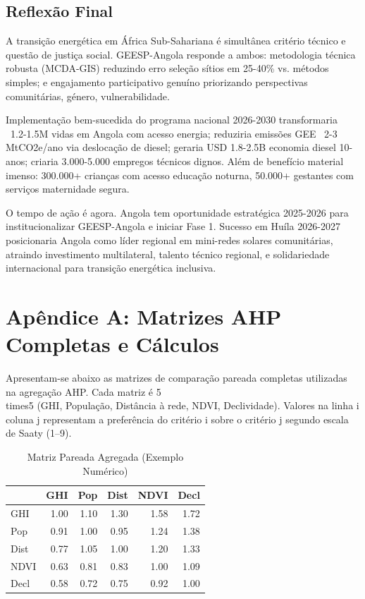 \documentclass[12pt, a4paper]{article}
\begin{document}
\subsection{Reflexão Final}

A transição energética em África Sub-Sahariana é simultânea critério técnico e questão de justiça social. GEESP-Angola responde a ambos: metodologia técnica robusta (MCDA-GIS) reduzindo erro seleção sítios em 25-40\% vs. métodos simples; e engajamento participativo genuíno priorizando perspectivas comunitárias, género, vulnerabilidade.

Implementação bem-sucedida do programa nacional 2026-2030 transformaria ~1.2-1.5M vidas em Angola com acesso energia; reduziria emissões GEE ~2-3 MtCO2e/ano via deslocação de diesel; geraria USD 1.8-2.5B economia diesel 10-anos; criaria 3.000-5.000 empregos técnicos dignos. Além de benefício material imenso: 300.000+ crianças com acesso educação noturna, 50.000+ gestantes com serviços maternidade segura.

O tempo de ação é agora. Angola tem oportunidade estratégica 2025-2026 para institucionalizar GEESP-Angola e iniciar Fase 1. Sucesso em Huíla 2026-2027 posicionaria Angola como líder regional em mini-redes solares comunitárias, atraindo investimento multilateral, talento técnico regional, e solidariedade internacional para transição energética inclusiva.

\clearpage
\section*{Apêndice A: Matrizes AHP Completas e Cálculos}

Apresentam-se abaixo as matrizes de comparação pareada completas utilizadas na agregação AHP. Cada matriz é 5\\times5 (GHI, População, Distância à rede, NDVI, Declividade). Valores na linha i coluna j representam a preferência do critério i sobre o critério j segundo escala de Saaty (1--9).

\begin{table}[H]
\centering
\caption{Matriz Pareada Agregada (Exemplo Numérico)}
\small
\begin{tabular}{lrrrrr}
\hline
 & GHI & Pop & Dist & NDVI & Decl \\
\hline
GHI   & 1.00 & 1.10 & 1.30 & 1.58 & 1.72 \\
Pop   & 0.91 & 1.00 & 0.95 & 1.24 & 1.38 \\
Dist  & 0.77 & 1.05 & 1.00 & 1.20 & 1.33 \\
NDVI  & 0.63 & 0.81 & 0.83 & 1.00 & 1.09 \\
Decl  & 0.58 & 0.72 & 0.75 & 0.92 & 1.00 \\
\hline
\end{tabular}
\end{table}
\end{document}
